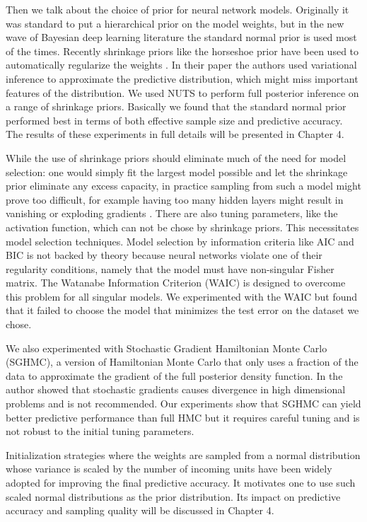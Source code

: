 \documentclass[]{report}
\begin{document}
Then we talk about the choice of prior for neural network models. Originally it was standard to put a hierarchical prior on the model weights, but in the new wave of Bayesian deep learning literature the standard normal prior is used most of the times. Recently shrinkage priors like the horseshoe prior have been used to automatically regularize the weights \cite{ghosh2017model}. In their paper the authors used variational inference to approximate the predictive distribution, which might miss important features of the  distribution. We used NUTS to perform full posterior inference on a range of shrinkage priors. Basically we found that the standard normal prior performed best in terms of both effective sample size and predictive accuracy. The results of these experiments in full details will be presented in Chapter 4.

While the use of shrinkage priors should eliminate much of the need for model selection: one would simply fit the largest model possible and let the shrinkage prior eliminate any excess capacity, in practice sampling from such a model might prove too difficult, for example having too many hidden layers might result in vanishing or exploding gradients \cite{bengio1994learning}. There are also tuning parameters, like the activation function, which can not be chose by shrinkage priors. This necessitates model selection techniques. Model selection by information criteria like AIC and BIC is not backed by theory because neural networks violate one of their regularity conditions, namely that the model must have non-singular Fisher matrix. The Watanabe Information Criterion (WAIC) is designed to overcome this problem for all singular models. We experimented with the WAIC but found that it failed to choose the model that minimizes the test error on the dataset we chose. 

We also experimented with Stochastic Gradient Hamiltonian Monte Carlo (SGHMC), a version of Hamiltonian Monte Carlo that only uses a fraction of the data to approximate the gradient of the full posterior density function. In \cite{betancourt2015fundamental} the author showed that stochastic gradients causes divergence in high dimensional problems and is not recommended. Our experiments show that SGHMC can yield better predictive performance than full HMC but it requires careful tuning and is not robust to the initial tuning parameters. 

Initialization strategies where the weights are sampled from a normal distribution whose variance is scaled by the number of incoming units have been widely adopted for improving the final predictive accuracy. It motivates one to use such scaled normal distributions as the prior distribution. Its impact on predictive accuracy and sampling quality will be discussed in Chapter 4. 
\end{document}
